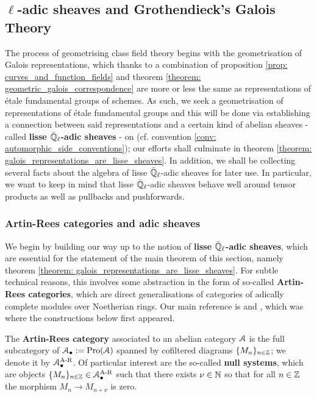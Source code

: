     \subsection{\texorpdfstring{$\ell$}{}-adic sheaves and Grothendieck's Galois Theory}
        The process of geometrising class field theory begins with the geometrisation of Galois representations, which thanks to a combination of proposition \ref{prop: curves_and_function_fields} and theorem \ref{theorem: geometric_galois_correspondence} are more or less the same as representations of \'etale fundamental groups of schemes. As such, we seek a geometrisation of representations of \'etale fundamental groups and this will be done via establishing a connection between said representations and a certain kind of abelian sheaves - called \textbf{lisse $\bar{\mathbb{Q}}_{\ell}$-adic sheaves} - on  (cf. convention \ref{conv: automorphic_side_conventions}); our efforts shall culminate in theorem \ref{theorem: galois_representations_are_lisse_sheaves}. In addition, we shall be collecting several facts about the algebra of lisse $\bar{\mathbb{Q}}_{\ell}$-adic sheaves for later use. In particular, we want to keep in mind that lisse $\bar{\mathbb{Q}}_{\ell}$-adic sheaves behave well around tensor products as well as pullbacks and pushforwards.  
    
        \subsubsection{Artin-Rees categories and adic sheaves}
            We begin by building our way up to the notion of \textbf{lisse $\bar{\mathbb{Q}}_{\ell}$-adic sheaves}, which are essential for the statement of the main theorem of this section, namely theorem \ref{theorem: galois_representations_are_lisse_sheaves}. For subtle technical reasons, this involves some abstraction in the form of so-called \textbf{Artin-Rees categories}, which are direct generalisations of categories of adically complete modules over Noetherian rings. Our main reference is \cite[Subsection 1.4]{conrad_etale_cohomology} and \cite[Expos\'e V]{sga5}, which was where the constructions below first appeared.
        
            \begin{definition} \label{def: artin_rees_categories}
                The \textbf{Artin-Rees category} associated to an abelian category $\mathcal{A}$ is the full subcategory of $\mathcal{A}_{\bullet} := \mathrm{Pro}(\mathcal{A})$ spanned by cofiltered diagrams $\{M_n\}_{n \in \mathbb{Z}}$; we denote it by $\mathcal{A}_{\bullet}^{\mathrm{A\text{-}R}}$. Of particular interest are the so-called \textbf{null systems}, which are objects $\{M_n\}_{n \in \mathbb{Z}} \in \mathcal{A}_{\bullet}^{\mathrm{A\text{-}R}}$ such that there exists $\nu \in \mathbb{N}$ so that for all $n \in \mathbb{Z}$ the morphism $M_n \to M_{n + \nu}$ is zero.
            \end{definition}
            
